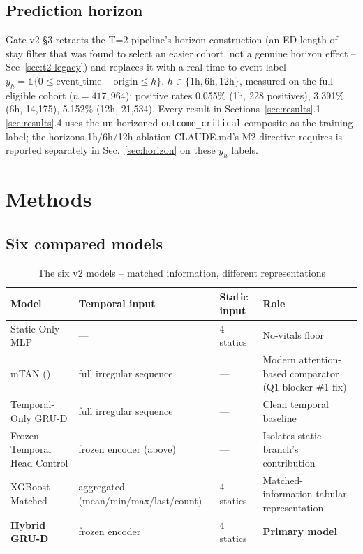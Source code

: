 \documentclass[11pt]{article}
\begin{document}
\subsection{Prediction horizon}
Gate v2 \S3 retracts the T=2 pipeline's horizon construction (an ED-length-of-stay filter that was found to select an easier cohort, not a genuine horizon effect -- Sec~\ref{sec:t2-legacy}) and replaces it with a real time-to-event label $y_h = \mathbb{1}\{0 \le \text{event\_time} - \text{origin} \le h\}$, $h \in \{1\text{h}, 6\text{h}, 12\text{h}\}$, measured on the full eligible cohort ($n=417{,}964$): positive rates 0.055\% (1h, 228 positives), 3.391\% (6h, 14{,}175), 5.152\% (12h, 21{,}534). Every result in Sections~\ref{sec:results}.1--\ref{sec:results}.4 uses the un-horizoned \texttt{outcome\_critical} composite as the training label; the horizons 1h/6h/12h ablation CLAUDE.md's M2 directive requires is reported separately in Sec.~\ref{sec:horizon} on these $y_h$ labels.

\section{Methods}

\subsection{Six compared models}
\begin{table}[H]
\centering
\caption{The six v2 models -- matched information, different representations}
\begin{tabular}{p{3.0cm}p{3.4cm}p{2.6cm}p{5.0cm}}
\toprule
Model & Temporal input & Static input & Role \\
\midrule
Static-Only MLP & --- & 4 statics & No-vitals floor \\
mTAN (\cite{shukla2021multi}) & full irregular sequence & --- & Modern attention-based comparator (Q1-blocker \#1 fix) \\
Temporal-Only GRU-D & full irregular sequence & --- & Clean temporal baseline \\
Frozen-Temporal Head Control & frozen encoder (above) & --- & Isolates static branch's contribution \\
XGBoost-Matched & aggregated (mean/min/max/last/count) & 4 statics & Matched-information tabular representation \\
\textbf{Hybrid GRU-D} & frozen encoder & 4 statics & \textbf{Primary model} \\
\bottomrule
\end{tabular}
\end{table}
\end{document}
